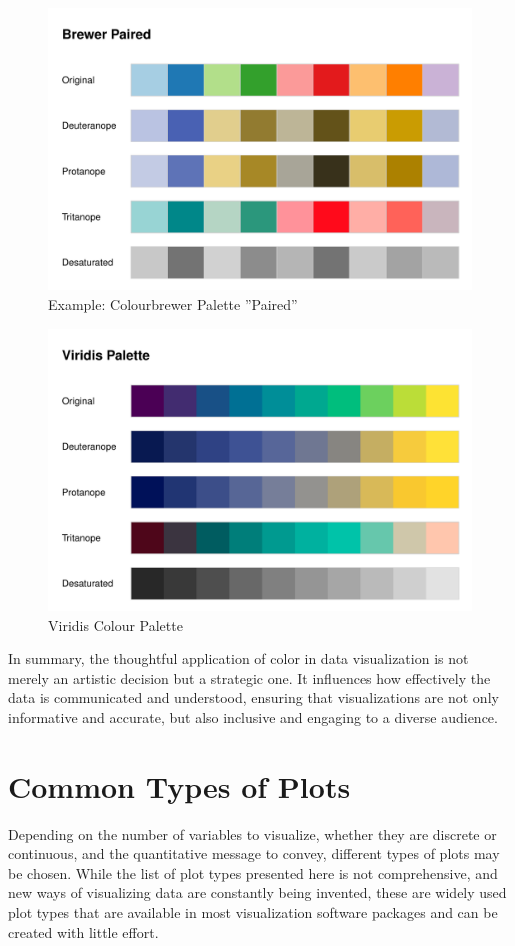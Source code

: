 \begin{figure}
\centering
  \includegraphics[width=.75\textwidth]{brewer.paired.cvd.pdf}

\caption{Example: Colourbrewer Palette ''Paired''}
\label{fig:paired}
\end{figure}

\begin{figure}
\centering
  \includegraphics[width=.75\textwidth]{viridis.plot.pdf}

\caption{Viridis Colour Palette}
\label{fig:viridis}
\end{figure}

In summary, the thoughtful application of color in data visualization is not merely an artistic decision but a strategic one. It influences how effectively the data is communicated and understood, ensuring that visualizations are not only informative and accurate, but also inclusive and engaging to a diverse audience.

\FloatBarrier

\section{Common Types of Plots}

Depending on the number of variables to visualize, whether they are discrete or continuous, and the quantitative message to convey, different types of plots may be chosen. While the list of plot types presented here is not comprehensive, and new ways of visualizing data are constantly being invented, these are widely used plot types that are available in most visualization software packages and can be created with little effort.

